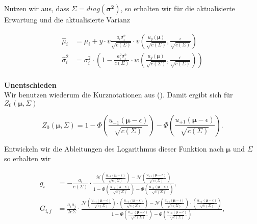 \documentclass[12pt,a4paper]{scrartcl}
\numberwithin{equation}{section}
\begin{document}
Nutzen wir aus, dass $\mathbf{\varSigma} = diag(\mathbf{\sigma^2})$, so erhalten wir für die aktualisierte Erwartung und die aktualisierte Varianz

\begin{equation}
\begin{split}
 \hat \mu_i &= \mu_i + y \cdot v \frac{a_i \sigma_i^2}{\sqrt{c(\mathbf{\varSigma})}} \cdot v \left ( \frac{u_y(\mathbf{\mu})}{\sqrt{c(\mathbf{\varSigma})}}, \frac{\epsilon}{\sqrt{c(\mathbf{\varSigma})}}  \right ) \\
 \hat \sigma_i^2 &= \sigma_i^2 \cdot \left ( 1 - \frac{a_i^2 \sigma_i^2}{c(\mathbf{\varSigma})} \cdot w \left ( \frac{u_y(\mathbf{\mu})}{\sqrt{c(\mathbf{\varSigma})}}, \frac{\epsilon}{\sqrt{c(\mathbf{\varSigma})}}  \right )  \right ) \\
 \end{split}
 \end{equation}

\textbf{Unentschieden	} \\
Wir benutzen wiederum die Kurznotationen aus (). Damit ergibt sich für $Z_0(\mathbf{\mu}, \mathbf{\varSigma})$

\begin{equation}
 Z_0(\mathbf{\mu}, \mathbf{\varSigma}) = 1 - \Phi \left( \frac{u_{-1}(\mathbf{\mu}- \epsilon)}{\sqrt{c (\mathbf{\varSigma})}} \right ) - \Phi \left( \frac{u_{+1}(\mathbf{\mu}- \epsilon)}{\sqrt{c (\mathbf{\varSigma})}} \right ).
\end{equation}

Entwickeln wir die Ableitungen des Logarithmus dieser Funktion nach $\mathbf{\mu}$ und $\mathbf{\varSigma}$ so erhalten wir 

\begin{equation}
 \begin{split}
   g_i &= - \frac{a_i}{c(\mathbf{\varSigma})} \cdot \frac{ \mathcal{N}\left( \frac{u_{-1}(\mathbf{\mu}- \epsilon)}{\sqrt{c (\mathbf{\varSigma})}} \right ) - \mathcal{N}\left( \frac{u_{+1}(\mathbf{\mu}- \epsilon)}{\sqrt{c (\mathbf{\varSigma})}} \right ) }{1 - \Phi \left( \frac{u_{-1}(\mathbf{\mu}- \epsilon)}{\sqrt{c (\mathbf{\varSigma})}} \right ) - \Phi \left( \frac{u_{+1}(\mathbf{\mu}- \epsilon)}{\sqrt{c (\mathbf{\varSigma})}} \right )}, \\  
   G_{i,j} &= \frac{a_i a_j}{2c \mathbf{\varSigma}} \cdot \frac{ \mathcal{N}\left( \frac{u_{-1}(\mathbf{\mu}- \epsilon)}{\sqrt{c (\mathbf{\varSigma})}} \right ) \cdot \left( \frac{u_{-1}(\mathbf{\mu}- \epsilon)}{\sqrt{c (\mathbf{\varSigma})}} \right ) - \mathcal{N}\left( \frac{u_{+1}(\mathbf{\mu}- \epsilon)}{\sqrt{c (\mathbf{\varSigma})}} \right ) \cdot \left( \frac{u_{+1}(\mathbf{\mu}- \epsilon)}{\sqrt{c (\mathbf{\varSigma})}} \right )}{1 - \Phi \left( \frac{u_{-1}(\mathbf{\mu}- \epsilon)}{\sqrt{c (\mathbf{\varSigma})}} \right ) - \Phi \left( \frac{u_{+1}(\mathbf{\mu}- \epsilon)}{\sqrt{c (\mathbf{\varSigma})}} \right )}, \\ 
 \end{split}
\end{equation}
\end{document}
